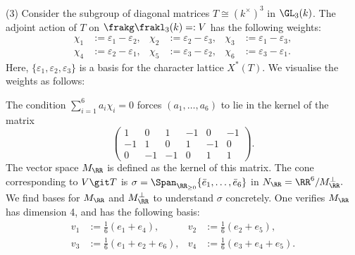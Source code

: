 \documentclass[12pt]{amsart}
\theoremstyle{plain}
\begin{document}
(3)
Consider the subgroup of diagonal matrices $T \cong (k^\times)^3$ in $\GL_3(k)$.
The adjoint action of $T$ on $\frakg\frakl_3(k) =: V$ has the following weights:
\begin{align*}
	\chi_1 &:= \varepsilon_1 - \varepsilon_2, & \chi_2 &:= \varepsilon_2 - \varepsilon_3, & \chi_3 &:= \varepsilon_1 - \varepsilon_3, \\
	\chi_4 &:= \varepsilon_2 - \varepsilon_1, & \chi_5 &:= \varepsilon_3 - \varepsilon_2, & \chi_6 &:= \varepsilon_3 - \varepsilon_1.
\end{align*}
Here, $\{\varepsilon_1, \varepsilon_2, \varepsilon_3\}$ is a basis for the character lattice $X^*(T)$.
We visualise the weights as follows:
\begin{center}
\end{center}
\noindent
The condition $\sum_{i=1}^6 a_i \chi_i = 0$ forces $(a_1, \ldots, a_6)$ to lie in the kernel of the matrix
$$
\begin{pmatrix}
	1 & 0 & 1 & -1 & 0 & -1 \\
	-1 & 1 & 0 & 1 & -1 & 0 \\
	0 & -1 & -1 & 0 & 1 & 1
\end{pmatrix}.
$$
The vector space $M_\RR$ is defined as the kernel of this matrix.
The cone corresponding to $V \git T$ is $\sigma = \Span_{\RR_{\ge 0}}\{\bar e_1, \ldots, \bar e_6\}$ in $N_\RR = \RR^6 / M_\RR^\perp.$
We find bases for $M_\RR$ and $M_\RR^\perp$ to understand $\sigma$ concretely.
One verifies $M_\RR$ has dimension 4, and has the following basis:
\begin{align*}
	v_1 &:= \frac{1}{6} (e_1+e_4), & v_2 &:= \frac{1}{6}(e_2+e_5), \\
	v_3 &:= \frac{1}{6}(e_1+e_2+e_6), & v_4 &:= \frac{1}{6}(e_3+e_4+e_5).
\end{align*}
\end{document}
